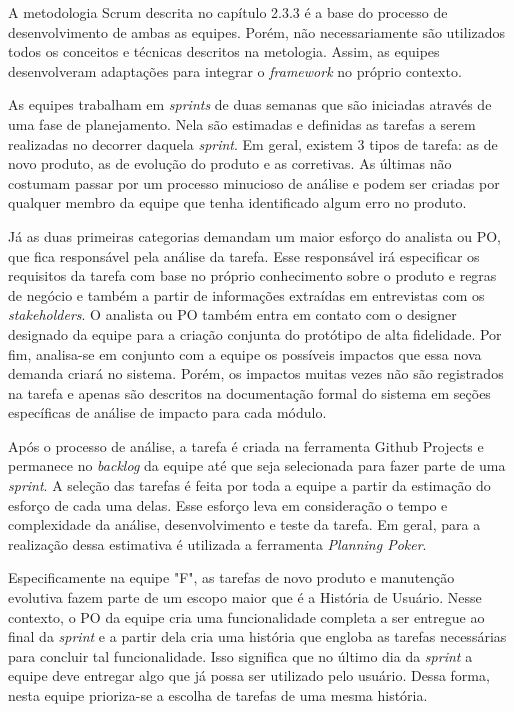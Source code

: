 \documentclass[
    12pt,       %
    openright,      %
    twoside,      %
    a4paper,      %
    english,      %
    french,       %
    spanish,      %
    brazil,       %
    ]{abntex2}
\begin{document}
A metodologia Scrum descrita no capítulo 2.3.3 é a base do processo de desenvolvimento de ambas as equipes. Porém, não necessariamente são utilizados todos os conceitos e técnicas descritos na metologia. Assim, as equipes desenvolveram adaptações para integrar o \textit{framework} no próprio contexto.

As equipes trabalham em \textit{sprints} de duas semanas que são iniciadas através de uma fase de planejamento. Nela são estimadas e definidas as tarefas a serem realizadas no decorrer daquela \textit{sprint}. Em geral, existem 3 tipos de tarefa: as de novo produto, as de evolução do produto e as corretivas. As últimas não costumam passar por um processo minucioso de análise e podem ser criadas por qualquer membro da equipe que tenha identificado algum erro no produto.

Já as duas primeiras categorias demandam um maior esforço do analista ou PO, que fica responsável pela análise da tarefa. Esse responsável irá especificar os requisitos da tarefa com base no próprio conhecimento sobre o produto e regras de negócio e também a partir de informações extraídas em entrevistas com os \textit{stakeholders}. O analista ou PO também entra em contato com o designer designado da equipe para a criação conjunta do protótipo de alta fidelidade. Por fim, analisa-se em conjunto com a equipe os possíveis impactos que essa nova demanda criará no sistema. Porém, os impactos muitas vezes não são registrados na tarefa e apenas são descritos na documentação formal do sistema em seções específicas de análise de impacto para cada módulo.

Após o processo de análise, a tarefa é criada na ferramenta Github Projects e permanece no \textit{backlog} da equipe até que seja selecionada para fazer parte de uma \textit{sprint}. A seleção das tarefas é feita por toda a equipe a partir da estimação do esforço de cada uma delas. Esse esforço leva em consideração o tempo e complexidade da análise, desenvolvimento e teste da tarefa. Em geral, para a realização dessa estimativa é utilizada a ferramenta \textit{Planning Poker}.

Especificamente na equipe "F", as tarefas de novo produto e manutenção evolutiva fazem parte de um escopo maior que é a História de Usuário. Nesse contexto, o PO da equipe cria uma funcionalidade completa a ser entregue ao final da \textit{sprint} e a partir dela cria uma história que engloba as tarefas necessárias para concluir tal funcionalidade. Isso significa que no último dia da \textit{sprint} a equipe deve entregar algo que já possa ser utilizado pelo usuário. Dessa forma, nesta equipe prioriza-se a escolha de tarefas de uma mesma história. 
\end{document}
